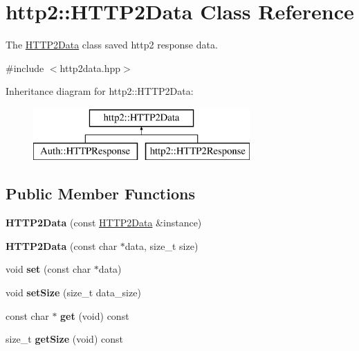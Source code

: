 \hypertarget{classhttp2_1_1HTTP2Data}{}\section{http2\+:\+:H\+T\+T\+P2\+Data Class Reference}
\label{classhttp2_1_1HTTP2Data}


The \hyperlink{classhttp2_1_1HTTP2Data}{H\+T\+T\+P2\+Data} class saved http2 response data.  




{\ttfamily \#include $<$http2data.\+hpp$>$}

Inheritance diagram for http2\+:\+:H\+T\+T\+P2\+Data\+:\begin{figure}[H]
\begin{center}
\leavevmode
\includegraphics[height=2.000000cm]{db/d5c/classhttp2_1_1HTTP2Data}
\end{center}
\end{figure}
\subsection*{Public Member Functions}
\begin{DoxyCompactItemize}
\item 
\mbox{\label{classhttp2_1_1HTTP2Data_ac933a5c5bde3a5d07ab958eef46d5020}} 
{\bfseries H\+T\+T\+P2\+Data} (const \hyperlink{classhttp2_1_1HTTP2Data}{H\+T\+T\+P2\+Data} \&instance)
\item 
\mbox{\label{classhttp2_1_1HTTP2Data_acf6d5f3d2c6d511e05aa4b93cb48e56d}} 
{\bfseries H\+T\+T\+P2\+Data} (const char $\ast$data, size\+\_\+t size)
\item 
\mbox{\label{classhttp2_1_1HTTP2Data_a938b3a45c993b1574256edba84b64d13}} 
void {\bfseries set} (const char $\ast$data)
\item 
\mbox{\label{classhttp2_1_1HTTP2Data_a85cf4c42f1c0d9caa867edf121e6ad7e}} 
void {\bfseries set\+Size} (size\+\_\+t data\+\_\+size)
\item 
\mbox{\label{classhttp2_1_1HTTP2Data_a51e813c45ecd112fdd1d0bd38060cc17}} 
const char $\ast$ {\bfseries get} (void) const
\item 
\mbox{\label{classhttp2_1_1HTTP2Data_ad55476f6a64f74932926ffc0cb998367}} 
size\+\_\+t {\bfseries get\+Size} (void) const
\end{DoxyCompactItemize}

